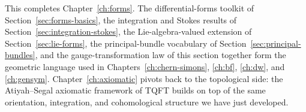 \medskip

\noindent This completes Chapter~\ref{ch:forms}. The differential-forms toolkit of Section~\ref{sec:forms-basics}, the integration and Stokes results of Section~\ref{sec:integration-stokes}, the Lie-algebra-valued extension of Section~\ref{sec:lie-forms}, the principal-bundle vocabulary of Section~\ref{sec:principal-bundles}, and the gauge-transformation law of this section together form the geometric language used in Chapters~\ref{ch:chern-simons}, \ref{ch:bf}, \ref{ch:dw}, and \ref{ch:gensym}. Chapter~\ref{ch:axiomatic} pivots back to the topological side: the Atiyah--Segal axiomatic framework of TQFT builds on top of the same orientation, integration, and cohomological structure we have just developed.

